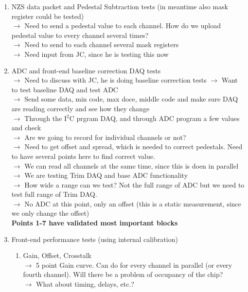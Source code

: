 \documentclass{lhcbnote}
\begin{document}
\begin{enumerate}
\item NZS data packet and Pedestal Subtraction tests (in meantime also mask register could be
tested) \\
$\rightarrow$ Need to send a pedestal value to each channel. How do we upload pedestal value to every channel several times? \\
$\rightarrow$ Need to send to each channel several mask registers \\
$\rightarrow$ Need input from JC, since he is testing this now


\item ADC and front-end baseline correction DAQ tests \\
$\rightarrow$ Need to discuss with JC, he is doing baseline correction tests
$\rightarrow$ Want to test baseline DAQ and test ADC \\
$\rightarrow$ Send some data, min code, max doce, middle code and make sure DAQ are reading correctly and see how they change \\
$\rightarrow$ Through the I$^2$C prgram DAQ, and through ADC program a few values and check \\
$\rightarrow$ Are we going to record for individual channels or not? \\
$\rightarrow$ Need to get offset and spread, which is needed to correct pedestals. Need to have several points here to find correct value. \\
$\rightarrow$ We can read all channels at the same time, since this is doen in parallel \\
$\rightarrow$ We are testing Trim DAQ and base ADC functionality \\
$\rightarrow$ How wide a range can we test? Not the full range of ADC but we need to test full range of Trim DAQ. \\
$\rightarrow$ No ADC at this point, only an offset (this is a static measurement, since we only change the offset) \\
\textbf{Points 1-7 have validated most important blocks}
\item Front-end performance tests (using internal calibration)
\begin{enumerate}
\item Gain, Offset, Crosstalk \\
$\rightarrow$ 5 point Gain curve. Can do for every channel in parallel (or every fourth channel). Will there be a problem of occupancy of the chip? \\
$\rightarrow$ What about timing, delays, etc.? \\

\end{enumerate}
\end{enumerate}
\end{document}
